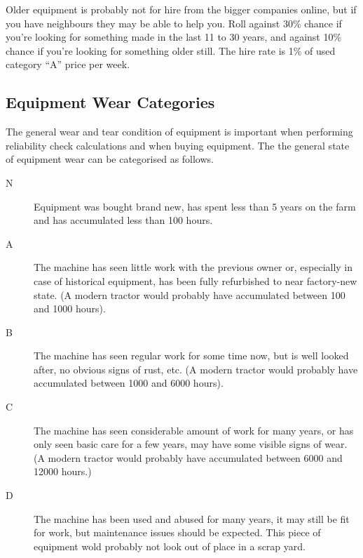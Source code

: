 \documentclass[a4paper,10pt]{article}
\begin{document}
Older equipment is probably not for hire from the bigger companies online, but
if you have neighbours they may be able to help you. Roll against 30\% chance if
you're looking for something made in the last 11 to 30 years, and against 10\%
chance if you're looking for something older still. The hire rate is 1\% of used
category ``A'' price per week.

\subsection{Equipment Wear Categories}

The general wear and tear condition of equipment is important when performing
reliability check calculations and when buying equipment. The the general state
of equipment wear can be categorised as follows.
\begin{description}
\item[N] Equipment was bought brand new, has spent less than 5 years on the
  farm and has accumulated less than 100 hours.
\item[A] The machine has seen little work with the previous owner or,
  especially in case of historical equipment, has been fully refurbished to near
  factory-new state. (A modern tractor would probably have accumulated between
  100 and 1000 hours).
\item[B] The machine has seen regular work for some time now, but is well
  looked after, no obvious signs of rust, etc. (A modern tractor would probably
  have accumulated between 1000 and 6000 hours).
\item[C] The machine has seen considerable amount of work for many years, or
  has only seen basic care for a few years, may have some visible signs of wear.
  (A modern tractor would probably have accumulated between 6000 and 12000
  hours.)
\item[D] The machine has been used and abused for many years, it may still be
  fit for work, but maintenance issues should be expected. This piece of
  equipment wold probably not look out of place in a scrap yard.
\end{description}
\end{document}
